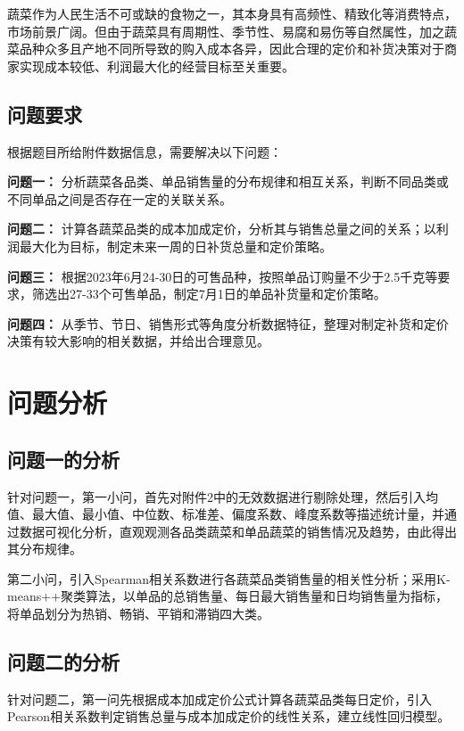 \documentclass[a4paper,12pt]{article}
\begin{document}
	蔬菜作为人民生活不可或缺的食物之一，其本身具有高频性、精致化等消费特点，市场前景广阔。但由于蔬菜具有周期性、季节性、易腐和易伤等自然属性，加之蔬菜品种众多且产地不同所导致的购入成本各异，因此合理的定价和补货决策对于商家实现成本较低、利润最大化的经营目标至关重要。
	
	\subsection{问题要求}
	
	根据题目所给附件数据信息，需要解决以下问题：
	
	\textbf{问题一：} 分析蔬菜各品类、单品销售量的分布规律和相互关系，判断不同品类或不同单品之间是否存在一定的关联关系。
	
	\textbf{问题二：} 计算各蔬菜品类的成本加成定价，分析其与销售总量之间的关系；以利润最大化为目标，制定未来一周的日补货总量和定价策略。
	
	\textbf{问题三：} 根据2023年6月24-30日的可售品种，按照单品订购量不少于2.5千克等要求，筛选出27-33个可售单品，制定7月1日的单品补货量和定价策略。
	
	\textbf{问题四：} 从季节、节日、销售形式等角度分析数据特征，整理对制定补货和定价决策有较大影响的相关数据，并给出合理意见。
	
	\newpage
	
	\section{问题分析}
	
	\subsection{问题一的分析}
	
	针对问题一，第一小问，首先对附件2中的无效数据进行剔除处理，然后引入均值、最大值、最小值、中位数、标准差、偏度系数、峰度系数等描述统计量，并通过数据可视化分析，直观观测各品类蔬菜和单品蔬菜的销售情况及趋势，由此得出其分布规律。
	
	第二小问，引入Spearman相关系数进行各蔬菜品类销售量的相关性分析；采用K-means++聚类算法，以单品的总销售量、每日最大销售量和日均销售量为指标，将单品划分为热销、畅销、平销和滞销四大类。
	
	\subsection{问题二的分析}
	
	针对问题二，第一问先根据成本加成定价公式计算各蔬菜品类每日定价，引入Pearson相关系数判定销售总量与成本加成定价的线性关系，建立线性回归模型。
	
\end{document}
